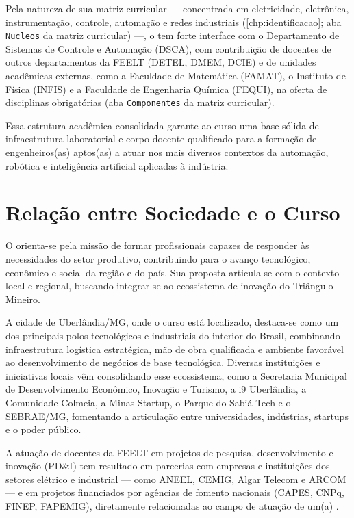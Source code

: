 Pela natureza de sua matriz curricular — concentrada em eletricidade, eletrônica, instrumentação, controle, automação e redes industriais (\autoref{chp:identificacao}; aba \texttt{Nucleos} da matriz curricular) —, o \ppccurso tem forte interface com o Departamento de Sistemas de Controle e Automação (DSCA), com contribuição de docentes de outros departamentos da FEELT (DETEL, DMEM, DCIE) e de unidades acadêmicas externas, como a Faculdade de Matemática (FAMAT), o Instituto de Física (INFIS) e a Faculdade de Engenharia Química (FEQUI), na oferta de disciplinas obrigatórias (aba \texttt{Componentes} da matriz curricular). %

Essa estrutura acadêmica consolidada garante ao curso uma base sólida de infraestrutura laboratorial e corpo docente qualificado para a formação de engenheiros(as) aptos(as) a atuar nos mais diversos contextos da automação, robótica e inteligência artificial aplicadas à indústria.

\section{Relação entre Sociedade e o Curso}

O \ppccurso orienta-se pela missão de formar profissionais capazes de responder às necessidades do setor produtivo, contribuindo para o avanço tecnológico, econômico e social da região e do país. Sua proposta articula-se com o contexto local e regional, buscando integrar-se ao ecossistema de inovação do Triângulo Mineiro.

A cidade de Uberlândia/MG, onde o curso está localizado, destaca-se como um dos principais polos tecnológicos e industriais do interior do Brasil, combinando infraestrutura logística estratégica, mão de obra qualificada e ambiente favorável ao desenvolvimento de negócios de base tecnológica. Diversas instituições e iniciativas locais vêm consolidando esse ecossistema, como a Secretaria Municipal de Desenvolvimento Econômico, Inovação e Turismo, a i9 Uberlândia, a Comunidade Colmeia, a Minas Startup, o Parque do Sabiá Tech e o SEBRAE/MG, fomentando a articulação entre universidades, indústrias, startups e o poder público.

A atuação de docentes da FEELT em projetos de pesquisa, desenvolvimento e inovação (PD\&I) tem resultado em parcerias com empresas e instituições dos setores elétrico e industrial — como ANEEL, CEMIG, Algar Telecom e ARCOM — e em projetos financiados por agências de fomento nacionais (CAPES, CNPq, FINEP, FAPEMIG), diretamente relacionadas ao campo de atuação de um(a) \ppctitulacao. %


